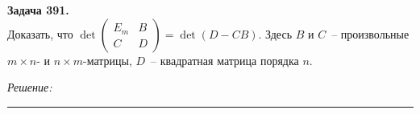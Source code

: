 \documentclass[a4paper, 12pt]{article}
\newenvironment{problem}[2][Задача]
    { \begin{mdframed}[backgroundcolor=gray!10] \textbf{#1 #2.} \\}
    {  \end{mdframed}}
\newenvironment{solution}
    {\textit{Решение: }}
    {\noindent\rule{7in}{1.5pt}}
\begin{document}
\begin{problem}{391}
Доказать, что $\det\left(\begin{array}{cc}E_m & B\\C & D\end{array}\right)=\det(D-CB)$.
Здесь $B$ и $C$~-- произвольные $m\times n$- и $n\times m$-матрицы, $D$~-- квадратная матрица порядка $n$.
\end{problem}
\begin{solution}



\end{solution} 

\end{document}
